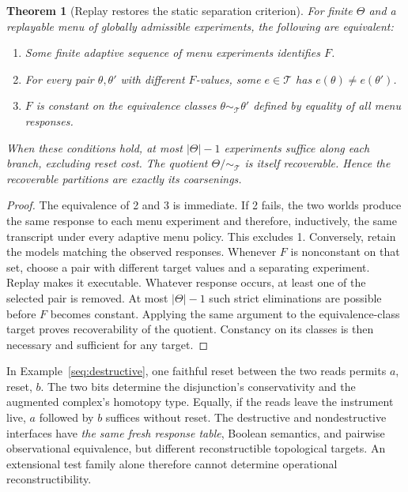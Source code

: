 \documentclass[11pt]{article}
\newtheorem{theorem}{Theorem}[section]
\theoremstyle{definition}
\begin{document}
\begin{theorem}[Replay restores the static separation criterion]
\label{seq:reset}
For finite $\Theta$ and a replayable menu of globally admissible experiments,
the following are equivalent:
\begin{enumerate}
\item Some finite adaptive sequence of menu experiments identifies $F$.
\item For every pair $\theta,\theta'$ with different $F$-values, some
      $e\in\mathcal T$ has $e(\theta)\ne e(\theta')$.
\item $F$ is constant on the equivalence classes
      $\theta\sim_{\mathcal T}\theta'$ defined by equality of all menu
      responses.
\end{enumerate}
When these conditions hold, at most $|\Theta|-1$ experiments suffice
along each branch, excluding reset cost. The quotient
$\Theta/{\sim_{\mathcal T}}$ is itself recoverable. Hence the recoverable
partitions are exactly its coarsenings.
\end{theorem}
\begin{proof}
The equivalence of 2 and 3 is immediate. If 2 fails, the two worlds produce
the same response to each menu experiment and therefore, inductively, the
same transcript under every adaptive menu policy. This excludes 1.
Conversely, retain the models matching the observed responses. Whenever
$F$ is nonconstant on that set, choose a pair with different target values
and a separating experiment. Replay makes it executable. Whatever response
occurs, at least one of the selected pair is removed. At most
$|\Theta|-1$ such strict eliminations are possible before $F$ becomes
constant. Applying the same argument to the equivalence-class target
proves recoverability of the quotient. Constancy on its classes is then
necessary and sufficient for any target.
\end{proof}

In Example~\ref{seq:destructive}, one faithful reset between the two
reads permits $a$, reset, $b$. The two bits determine the disjunction's
conservativity and the augmented complex's homotopy type. Equally, if the
reads leave the instrument live, $a$ followed by $b$ suffices without reset.
The destructive and nondestructive interfaces have \emph{the same fresh
response table}, Boolean semantics, and pairwise observational equivalence,
but different reconstructible topological targets. An extensional test
family alone therefore cannot determine operational reconstructibility.
\end{document}
